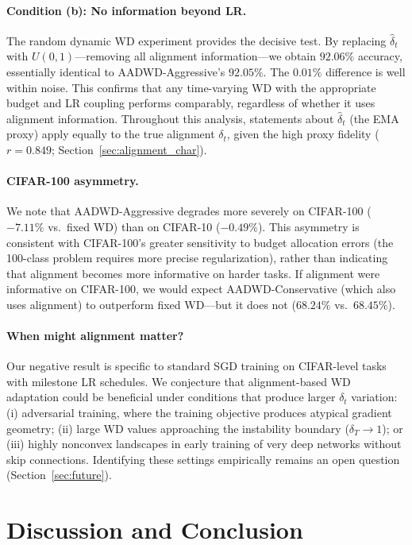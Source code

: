 \documentclass{article}
\begin{document}
\paragraph{Condition (b): No information beyond LR.}
The random dynamic WD experiment provides the decisive test.
By replacing $\hat{\delta}_t$ with $U(0,1)$---removing all alignment
information---we obtain $92.06\%$ accuracy, essentially identical to
AADWD-Aggressive's $92.05\%$.
The $0.01\%$ difference is well within noise.
This confirms that any time-varying WD with the appropriate budget and LR coupling
performs comparably, regardless of whether it uses alignment information.
Throughout this analysis, statements about $\hat{\delta}_t$ (the EMA proxy) apply
equally to the true alignment $\delta_t$, given the high proxy fidelity
($r = 0.849$; Section~\ref{sec:alignment_char}).

\paragraph{CIFAR-100 asymmetry.}
We note that AADWD-Aggressive degrades more severely on CIFAR-100 ($-7.11\%$ vs.\
fixed WD) than on CIFAR-10 ($-0.49\%$).
This asymmetry is consistent with CIFAR-100's greater sensitivity to budget
allocation errors (the 100-class problem requires more precise regularization),
rather than indicating that alignment becomes more informative on harder tasks.
If alignment were informative on CIFAR-100, we would expect AADWD-Conservative
(which also uses alignment) to outperform fixed WD---but it does not ($68.24\%$
vs.\ $68.45\%$).

\paragraph{When might alignment matter?}
Our negative result is specific to standard SGD training on CIFAR-level tasks with
milestone LR schedules.
We conjecture that alignment-based WD adaptation could be beneficial under conditions
that produce larger $\delta_t$ variation:
(i) adversarial training, where the training objective produces atypical gradient
geometry;
(ii) large WD values approaching the instability boundary ($\delta_T \to 1$); or
(iii) highly nonconvex landscapes in early training of very deep networks without
skip connections.
Identifying these settings empirically remains an open question
(Section~\ref{sec:future}).

\section{Discussion and Conclusion}
\label{sec:discussion}
\end{document}
